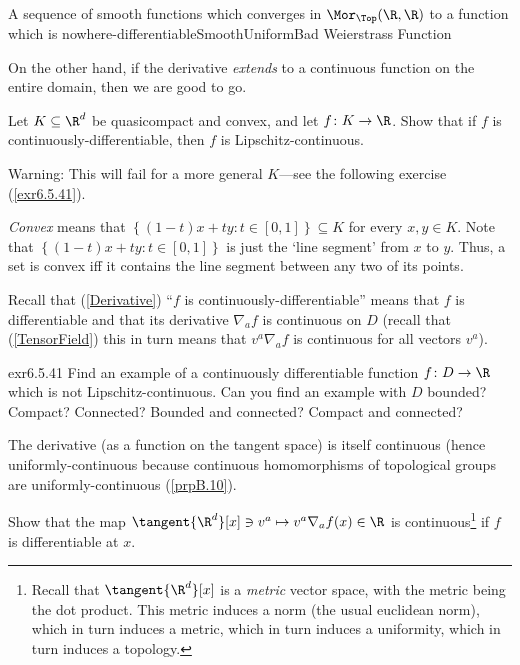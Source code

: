 \begin{exm}{A sequence of smooth functions which converges in $\Mor _{\Top}(\R ,\R )$ to a function which is nowhere-differentiable}{SmoothUniformBad}
Weierstrass Function
\end{exm}
On the other hand, if the derivative \emph{extends} to a continuous function on the entire domain, then we are good to go.
\begin{exr}{}{}
Let $K\subseteq \R ^d$ be quasicompact and convex, and let $f\colon K\rightarrow \R$.  Show that if $f$ is continuously-differentiable, then $f$ is Lipschitz-continuous.
\begin{wrn}
Warning:  This will fail for a more general $K$---see the following exercise (\cref{exr6.5.41}).
\end{wrn}
\begin{rmk}
\emph{Convex} means that $\left\{ (1-t)x+ty:t\in [0,1]\right\} \subseteq K$ for every $x,y\in K$.  Note that $\left\{ (1-t)x+ty:t\in [0,1]\right\}$ is just the `line segment' from $x$ to $y$.  Thus, a set is convex iff it contains the line segment between any two of its points.
\end{rmk}
\begin{rmk}
Recall that (\cref{Derivative}) ``$f$ is continuously-differentiable'' means that $f$ is differentiable and that its derivative $\nabla _af$ is continuous on $D$ (recall that (\cref{TensorField}) this in turn means that $v^a\nabla _af$ is continuous for all vectors $v^a$).
\end{rmk}
\end{exr}
\begin{exr}{}{exr6.5.41}
Find an example of a continuously differentiable function $f\colon D\rightarrow \R$ which is not Lipschitz-continuous.  Can you find an example with $D$ bounded?  Compact?  Connected?  Bounded and connected?  Compact and connected?
\end{exr}

The derivative (as a function on the tangent space) is itself continuous (hence uniformly-continuous because continuous homomorphisms of topological groups are uniformly-continuous (\cref{prpB.10}).
\begin{exr}{}{}
Show that the map $\tangent{\R ^d}[x]\ni v^a\mapsto v^a\nabla _af(x)\in \R$ is continuous\footnote{Recall that $\tangent{\R ^d}[x]$ is a \emph{metric} vector space, with the metric being the dot product.  This metric induces a norm (the usual euclidean norm), which in turn induces a metric, which in turn induces a uniformity, which in turn induces a topology.} if $f$ is differentiable at $x$.
\end{exr}

